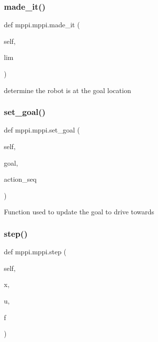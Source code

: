 \subsubsection{\texorpdfstring{made\+\_\+it()}{made\_it()}}
{\footnotesize\ttfamily def mppi.\+mppi.\+made\+\_\+it (\begin{DoxyParamCaption}\item[{}]{self,  }\item[{}]{lim }\end{DoxyParamCaption})}

\begin{DoxyVerb}determine the robot is at the goal location
\end{DoxyVerb}
 \mbox{\label{classmppi_1_1mppi_ae8da14cd9e13cc8db319b60342534759}} 
\subsubsection{\texorpdfstring{set\+\_\+goal()}{set\_goal()}}
{\footnotesize\ttfamily def mppi.\+mppi.\+set\+\_\+goal (\begin{DoxyParamCaption}\item[{}]{self,  }\item[{}]{goal,  }\item[{}]{action\+\_\+seq }\end{DoxyParamCaption})}

\begin{DoxyVerb}Function used to update the goal to drive towards
\end{DoxyVerb}
 \mbox{\label{classmppi_1_1mppi_aefb1b323eed26eb12ddfaf7dfa51365b}} 
\subsubsection{\texorpdfstring{step()}{step()}}
{\footnotesize\ttfamily def mppi.\+mppi.\+step (\begin{DoxyParamCaption}\item[{}]{self,  }\item[{}]{x,  }\item[{}]{u,  }\item[{}]{f }\end{DoxyParamCaption})}

